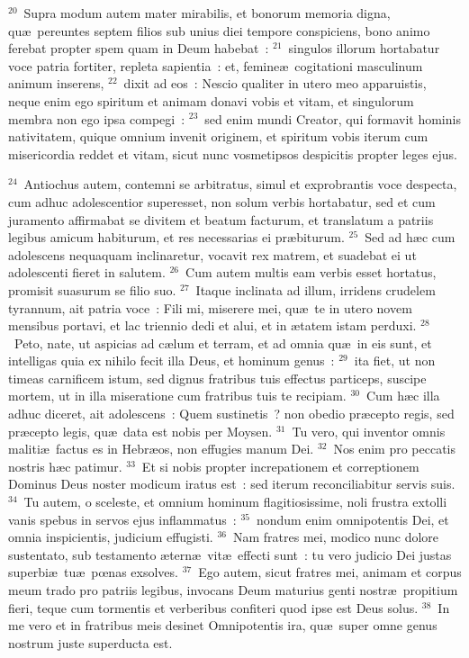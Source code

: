 ${}^{20}$~Supra modum autem mater mirabilis, et bonorum memoria digna, qu\ae\ pereuntes septem filios sub unius diei tempore conspiciens, bono animo ferebat propter spem quam in Deum habebat~:
${}^{21}$~singulos illorum hortabatur voce patria fortiter, repleta sapientia~: et, femine\ae\ cogitationi masculinum animum inserens,
${}^{22}$~dixit ad eos~: Nescio qualiter in utero meo apparuistis, neque enim ego spiritum et animam donavi vobis et vitam, et singulorum membra non ego ipsa compegi~:
${}^{23}$~sed enim mundi Creator, qui formavit hominis nativitatem, quique omnium invenit originem, et spiritum vobis iterum cum misericordia reddet et vitam, sicut nunc vosmetipsos despicitis propter leges ejus.


${}^{24}$~Antiochus autem, contemni se arbitratus, simul et exprobrantis voce despecta, cum adhuc adolescentior superesset, non solum verbis hortabatur, sed et cum juramento affirmabat se divitem et beatum facturum, et translatum a patriis legibus amicum habiturum, et res necessarias ei pr\ae biturum.
${}^{25}$~Sed ad h\ae c cum adolescens nequaquam inclinaretur, vocavit rex matrem, et suadebat ei ut adolescenti fieret in salutem.
${}^{26}$~Cum autem multis eam verbis esset hortatus, promisit suasurum se filio suo.
${}^{27}$~Itaque inclinata ad illum, irridens crudelem tyrannum, ait patria voce~: Fili mi, miserere mei, qu\ae\ te in utero novem mensibus portavi, et lac triennio dedi et alui, et in \ae tatem istam perduxi.
${}^{28}$~Peto, nate, ut aspicias ad c\ae lum et terram, et ad omnia qu\ae\ in eis sunt, et intelligas quia ex nihilo fecit illa Deus, et hominum genus~:
${}^{29}$~ita fiet, ut non timeas carnificem istum, sed dignus fratribus tuis effectus particeps, suscipe mortem, ut in illa miseratione cum fratribus tuis te recipiam.
${}^{30}$~Cum h\ae c illa adhuc diceret, ait adolescens~: Quem sustinetis~? non obedio pr\ae cepto regis, sed pr\ae cepto legis, qu\ae\ data est nobis per Moysen.
${}^{31}$~Tu vero, qui inventor omnis maliti\ae\ factus es in Hebr\ae os, non effugies manum Dei.
${}^{32}$~Nos enim pro peccatis nostris h\ae c patimur.
${}^{33}$~Et si nobis propter increpationem et correptionem Dominus Deus noster modicum iratus est~: sed iterum reconciliabitur servis suis.
${}^{34}$~Tu autem, o sceleste, et omnium hominum flagitiosissime, noli frustra extolli vanis spebus in servos ejus inflammatus~:
${}^{35}$~nondum enim omnipotentis Dei, et omnia inspicientis, judicium effugisti.
${}^{36}$~Nam fratres mei, modico nunc dolore sustentato, sub testamento \ae tern\ae\ vit\ae\ effecti sunt~: tu vero judicio Dei justas superbi\ae\ tu\ae\ pœnas exsolves.
${}^{37}$~Ego autem, sicut fratres mei, animam et corpus meum trado pro patriis legibus, invocans Deum maturius genti nostr\ae\ propitium fieri, teque cum tormentis et verberibus confiteri quod ipse est Deus solus.
${}^{38}$~In me vero et in fratribus meis desinet Omnipotentis ira, qu\ae\ super omne genus nostrum juste superducta est.


